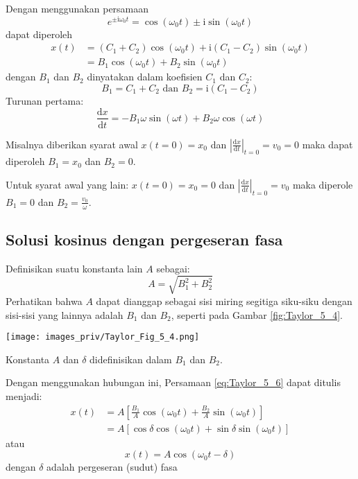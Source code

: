Dengan menggunakan persamaan
\begin{equation*}
e^{\pm\mathrm{i}\omega_{0} t} = \cos(\omega_{0} t)\pm\mathrm{i}\sin(\omega_{0} t)
\end{equation*}
%
dapat diperoleh
%
\begin{align*}
x(t) & = (C_{1} + C_{2}) \cos(\omega_{0} t) + \mathrm{i}(C_{1} - C_{2})\sin(\omega_{0} t) \nonumber \\
     & = B_{1}\cos(\omega_{0} t) + B_{2}\sin(\omega_{0} t) \label{eq:Taylor_5-6}
\end{align*}
%
dengan $B_1$ dan $B_2$ dinyatakan dalam koefisien $C_1$ dan $C_2$:
%
\begin{equation}
B_{1} = C_{1} + C_{2} \text{ dan } B_{2} = \mathrm{i}(C_{1} - C_{2})
\label{eq:Taylor_5_7}
\end{equation}
%
Turunan pertama:
\begin{equation*}
\frac{\mathrm{d}x}{\mathrm{d}t}=-B_{1}\omega\sin(\omega t)+B_{2}\omega\cos(\omega t)
\end{equation*}

Misalnya diberikan syarat awal
$x(t=0) = x_{0}$
dan
$\left|\frac{\mathrm{d}x}{\mathrm{d}t}\right|_{t=0} = v_{0} = 0$
maka dapat diperoleh $B_{1} = x_{0}$ dan $B_{2} = 0$.

Untuk syarat awal yang lain:
$x(t=0) = x_0 = 0$
dan
$\left|\frac{\mathrm{d}x}{\mathrm{d}t}\right|_{t=0} = v_{0}$
maka diperole $B_{1} = 0$ dan $B_{2} = \frac{v_{0}}{\omega}$.

\subsection*{Solusi kosinus dengan pergeseran fasa}

Definisikan suatu konstanta lain $A$ sebagai:
\begin{equation}
A = \sqrt{B_{1}^{2} + B_{2}^{2}}
\label{eq:Taylor_5_10}
\end{equation}
Perhatikan bahwa $A$ dapat dianggap sebagai sisi miring segitiga siku-siku dengan
sisi-sisi yang lainnya adalah $B_1$ dan $B_2$, seperti pada Gambar \ref{fig:Taylor_5_4}.

\begin{marginfigure}
\texttt{[image: images\_priv/Taylor\_Fig\_5\_4.png]}
\caption{Konstanta $A$ dan $\delta$ didefinisikan dalam $B_1$ dan $B_2$.}
\label{fig:Taylor_5_4}
\end{marginfigure}

Dengan menggunakan hubungan ini, Persamaan \eqref{eq:Taylor_5_6} dapat
ditulis menjadi:
\begin{align*}
x(t) & = A \left[\frac{B_{1}}{A}\cos(\omega_0 t) + \frac{B_{2}}{A}\sin(\omega_0 t) \right] \\
     & = A\left[ \cos\delta\cos(\omega_0 t)+\sin\delta\sin(\omega_0 t) \right]
\end{align*}
atau
\begin{equation}
  x(t) = A \cos(\omega_0 t - \delta)
  \label{eq:Taylor_5_11}
\end{equation}
dengan $\delta$ adalah pergeseran (sudut) fasa


